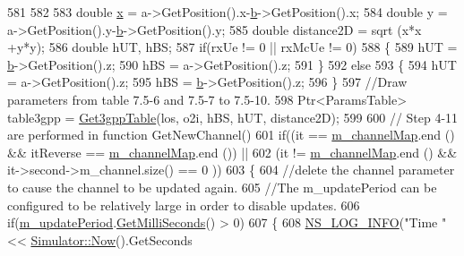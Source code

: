 \begin{DoxyCode}
581 
582 
583                 \textcolor{keywordtype}{double} \hyperlink{lte__link__budget__x2__handover__measures_8m_a9336ebf25087d91c818ee6e9ec29f8c1}{x} = a->GetPosition().x-\hyperlink{buildings__pathloss_8m_a21ad0bd836b90d08f4cf640b4c298e7c}{b}->GetPosition().x;
584                 \textcolor{keywordtype}{double} y = a->GetPosition().y-\hyperlink{buildings__pathloss_8m_a21ad0bd836b90d08f4cf640b4c298e7c}{b}->GetPosition().y;
585                 \textcolor{keywordtype}{double} distance2D = sqrt (x*x +y*y);
586                 \textcolor{keywordtype}{double} hUT, hBS;
587                 \textcolor{keywordflow}{if}(rxUe != 0 || rxMcUe != 0)
588                 \{
589                         hUT = \hyperlink{buildings__pathloss_8m_a21ad0bd836b90d08f4cf640b4c298e7c}{b}->GetPosition().z;
590                         hBS = a->GetPosition().z;
591                 \}
592                 \textcolor{keywordflow}{else}
593                 \{
594                         hUT = a->GetPosition().z;
595                         hBS = \hyperlink{buildings__pathloss_8m_a21ad0bd836b90d08f4cf640b4c298e7c}{b}->GetPosition().z;
596                 \}
597                 \textcolor{comment}{//Draw parameters from table 7.5-6 and 7.5-7 to 7.5-10.}
598                 Ptr<ParamsTable> table3gpp = \hyperlink{classns3_1_1MmWave3gppChannel_a4d31cc933c700d3b6c405b47765a2b02}{Get3gppTable}(los, o2i, hBS, hUT, distance2D);
599 
600                 \textcolor{comment}{// Step 4-11 are performed in function GetNewChannel()}
601                 \textcolor{keywordflow}{if}((it == \hyperlink{classns3_1_1MmWave3gppChannel_a31f05f0c8a438b8ce89f29813e863040}{m\_channelMap}.end () && itReverse == 
      \hyperlink{classns3_1_1MmWave3gppChannel_a31f05f0c8a438b8ce89f29813e863040}{m\_channelMap}.end ()) ||
602                                 (it != \hyperlink{classns3_1_1MmWave3gppChannel_a31f05f0c8a438b8ce89f29813e863040}{m\_channelMap}.end () && it->second->m\_channel.size() == 0
      ))
603                 \{
604                         \textcolor{comment}{//delete the channel parameter to cause the channel to be updated again.}
605                         \textcolor{comment}{//The m\_updatePeriod can be configured to be relatively large in order to disable
       updates.}
606                         \textcolor{keywordflow}{if}(\hyperlink{classns3_1_1MmWave3gppChannel_a2844f8c7e7373cb777384eaf0e8a7b11}{m\_updatePeriod}.\hyperlink{classns3_1_1Time_aba3428a8b6c4c8d9014ce44145081f34}{GetMilliSeconds}() > 0)
607                         \{
608                                 \hyperlink{group__logging_gafbd73ee2cf9f26b319f49086d8e860fb}{NS\_LOG\_INFO}(\textcolor{stringliteral}{"Time "} << \hyperlink{classns3_1_1Simulator_ac3178fa975b419f7875e7105be122800}{Simulator::Now}().GetSeconds

\end{DoxyCode}
